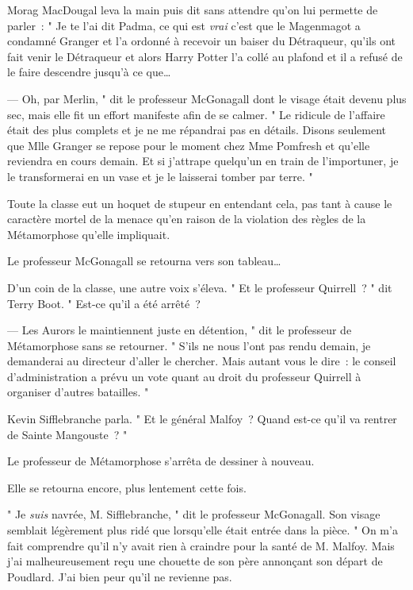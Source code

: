 Morag MacDougal leva la main puis dit sans attendre qu'on lui permette de parler~: " Je te l'ai dit Padma, ce qui est \emph{vrai} c'est que le Magenmagot a condamné Granger et l'a ordonné à recevoir un baiser du Détraqueur, qu'ils ont fait venir le Détraqueur et alors Harry Potter l'a collé au plafond et il a refusé de le faire descendre jusqu'à ce que… 

---  Oh, par Merlin, " dit le professeur McGonagall dont le visage était devenu plus sec, mais elle fit un effort manifeste afin de se calmer. " Le ridicule de l'affaire était des plus complets et je ne me répandrai pas en détails. Disons seulement que Mlle Granger se repose pour le moment chez Mme Pomfresh et qu'elle reviendra en cours demain. Et si j'attrape quelqu'un en train de l'importuner, je le transformerai en un vase et je le laisserai tomber par terre. "

Toute la classe eut un hoquet de stupeur en entendant cela, pas tant à cause le caractère mortel de la menace qu'en raison de la violation des règles de la Métamorphose qu'elle impliquait.

Le professeur McGonagall se retourna vers son tableau…

D'un coin de la classe, une autre voix s'éleva. " Et le professeur Quirrell~? " dit Terry Boot. " Est-ce qu'il a été arrêté~? 

---  Les Aurors le maintiennent juste en détention, " dit le professeur de Métamorphose sans se retourner. " S'ils ne nous l'ont pas rendu demain, je demanderai au directeur d'aller le chercher. Mais autant vous le dire~: le conseil d'administration a prévu un vote quant au droit du professeur Quirrell à organiser d'autres batailles. "

Kevin Sifflebranche parla. " Et le général Malfoy~? Quand est-ce qu'il va rentrer de Sainte Mangouste~? "

Le professeur de Métamorphose s'arrêta de dessiner à nouveau.

Elle se retourna encore, plus lentement cette fois.

" Je \emph{suis} navrée, M. Sifflebranche, " dit le professeur McGonagall. Son visage semblait légèrement plus ridé que lorsqu'elle était entrée dans la pièce. " On m'a fait comprendre qu'il n'y avait rien à craindre pour la santé de M. Malfoy. Mais j'ai malheureusement reçu une chouette de son père annonçant son départ de Poudlard. J'ai bien peur qu'il ne revienne pas. 
